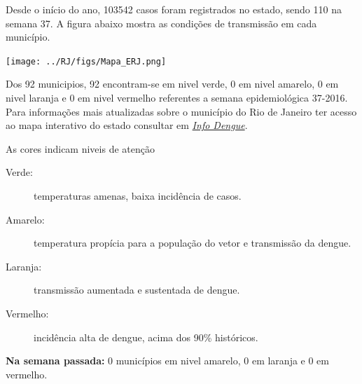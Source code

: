 \documentclass[10pt]{article} %
\begin{document}
\begin{minipage}[t]{.66\linewidth} %

  \hypertarget{estado}{} %

Desde o início do ano, 103542 casos foram registrados no estado, sendo 110 na semana 37. A figura abaixo mostra as condições de transmissão em cada município.

\texttt{[image: ../RJ/figs/Mapa\_ERJ.png]}
  
  Dos 92 municipios, 92 encontram-se em nivel verde, 0 em nivel amarelo, 0 em nivel laranja e 0 em nivel vermelho referentes a semana epidemiológica 37-2016. Para informações mais atualizadas
sobre o município do Rio de Janeiro ter acesso ao mapa interativo do estado consultar em \href{http://info.dengue.mat.br}{\textit{Info Dengue}}.


  \vspace{1cm}
\begin{mdframed}[style=intextbox,frametitle={}] %

\hypertarget{descriptivebox}{} %
As cores indicam niveis de atenção
\begin{description}
\item[Verde:] temperaturas amenas, baixa incidência de casos.      
\item[Amarelo:] temperatura propícia para a população do vetor e transmissão da dengue.
\item[Laranja:] transmissão aumentada e sustentada de dengue. 
\item[Vermelho:] incidência alta de dengue, acima dos 90\% históricos.
\end{description}
\end{mdframed}

\textbf{Na semana passada:} 0 municípios em nivel amarelo, 0 em laranja e 0 em vermelho.  

\end{minipage} %
\end{document}
